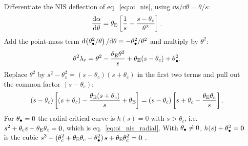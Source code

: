 \begin{derivation}
Differentiate the NIS deflection of eq.~\eqref{eq:oi_nis}, using
$\dd s/\dd\theta=\theta/s$:
\[
  \frac{\mathrm{d} \alpha}{\mathrm{d} \theta}
  = \theta_{\mathrm{E}}\left[\frac{1}{s} - \frac{s-\theta_c}{\theta^2}\right].
\]
Add the point-mass term $\dd(\theta_{\bullet}^2/\theta)/\dd\theta=-\theta_{\bullet}^2/\theta^2$
and multiply by $\theta^2$:
\[
  \theta^2\lambda_r = \theta^2 - \frac{\theta_{\mathrm{E}}\theta^2}{s}
                    + \theta_{\mathrm{E}}(s-\theta_c) + \theta_{\bullet}^2 .
\]
Replace $\theta^2$ by $s^2-\theta_c^2=(s-\theta_c)(s+\theta_c)$ in the
first two terms and pull out the common factor $(s-\theta_c)$:
\[
  (s-\theta_c)\left[(s+\theta_c) - \frac{\theta_{\mathrm{E}}(s+\theta_c)}{s} + \theta_{\mathrm{E}}\right]
  = (s-\theta_c)\left[s+\theta_c-\frac{\theta_{\mathrm{E}}\theta_c}{s}\right].
\]
For $\theta_{\bullet}=0$ the radial critical curve is $h(s)=0$ with
$s>\theta_c$, i.e.\ $s^2+\theta_c s-\theta_{\mathrm{E}}\theta_c=0$, which is
eq.~\eqref{eq:oi_nis_radial}.  With $\theta_{\bullet}\neq0$, $h(s)+\theta_{\bullet}^2=0$
is the cubic $s^3-(\theta_c^2+\theta_{\mathrm{E}}\theta_c-\theta_{\bullet}^2)\,s+\theta_{\mathrm{E}}\theta_c^2=0$
.
\end{derivation}

